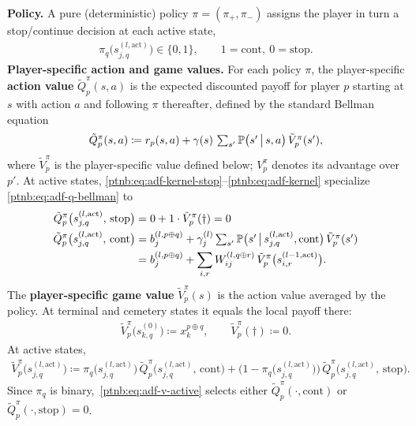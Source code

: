 \begin{definition}
\textbf{Policy.} A pure (deterministic) policy $\pi=(\pi_+,\pi_-)$ assigns the player in turn a
stop/continue decision at each active state,
\begin{align}
    \pi_q\bigl(s_{j,q}^{(l, \mathrm{act})}\bigr) \in \{0, 1\},
    \qquad
    1 = \mathrm{cont},\ 0 = \mathrm{stop}.
\end{align}
\textbf{Player-specific action and game values.} For each policy $\pi$, the player-specific
\textbf{action value} $\tilde{Q}_p^\pi(s, a)$ is the expected discounted payoff for player $p$
starting at $s$ with action $a$ and following $\pi$ thereafter, defined by the standard Bellman
equation
\begin{align}\label{ptnb:eq:adf-q-bellman}
    \tilde{Q}_p^\pi(s, a) \coloneqq r_p(s, a) + \gamma(s)\, \textstyle\sum_{s'} \P\bigl(s' \,\big|\, s,
    a\bigr)\, \tilde{V}_p^\pi(s'),
\end{align}
where $\tilde V_p^\pi$ is the player-specific value defined below; $V_p^\pi$ denotes its advantage
over $p'$. At active states, \eqref{ptnb:eq:adf-kernel-stop}--\eqref{ptnb:eq:adf-kernel} specialize
\eqref{ptnb:eq:adf-q-bellman} to
\begin{align}\label{ptnb:eq:adf-q-stop}
    \tilde{Q}_p^\pi\bigl(s_{j,q}^{(l, \mathrm{act})},\, \mathrm{stop}\bigr) &= 0 + 1 \cdot
    \tilde{V}_p^\pi(\dagger) = 0 \\ \label{ptnb:eq:adf-q-cont}
    \tilde{Q}_p^\pi\bigl(s_{j,q}^{(l, \mathrm{act})},\, \mathrm{cont}\bigr)
    &= b_j^{(l, p \oplus q)} + \gamma_j^{(l)} \textstyle\sum_{s'} \P\bigl(s' \,\big|\, s_{j,q}^{(l,
    \mathrm{act})}, \mathrm{cont}\bigr)\, \tilde{V}_p^\pi(s') \\
    &= b_j^{(l, p \oplus q)} + \sum_{i,r} W_{ij}^{(l, q \oplus r)}\,
    \tilde{V}_p^\pi\bigl(s_{i,r}^{(l-1, \mathrm{act})}\bigr).
\end{align}
The \textbf{player-specific game value} $\tilde{V}_p^\pi(s)$ is the action value averaged by the
policy. At terminal and cemetery states it equals the local payoff there:
\begin{align}\label{ptnb:eq:adf-v-terminal}
    \tilde{V}_p^\pi\bigl(s_{k,q}^{(0)}\bigr) \coloneqq x_k^{p \oplus q},
    \qquad
    \tilde{V}_p^\pi(\dagger) \coloneqq 0.
\end{align}
At active states,
\begin{align}\label{ptnb:eq:adf-v-active}
    \tilde{V}_p^\pi\bigl(s_{j,q}^{(l, \mathrm{act})}\bigr) \coloneqq \pi_q\bigl(s_{j,q}^{(l,
    \mathrm{act})}\bigr)\, \tilde{Q}_p^\pi\bigl(s_{j,q}^{(l, \mathrm{act})},\, \mathrm{cont}\bigr) +
    \bigl(1 - \pi_q\bigl(s_{j,q}^{(l, \mathrm{act})}\bigr)\bigr)\, \tilde{Q}_p^\pi\bigl(s_{j,q}^{(l,
    \mathrm{act})},\, \mathrm{stop}\bigr).
\end{align}
Since $\pi_q$ is binary,~\eqref{ptnb:eq:adf-v-active} selects either $\tilde{Q}_p^\pi(\cdot,
    \mathrm{cont})$ or $\tilde{Q}_p^\pi(\cdot, \mathrm{stop}) = 0$.


\end{definition}
